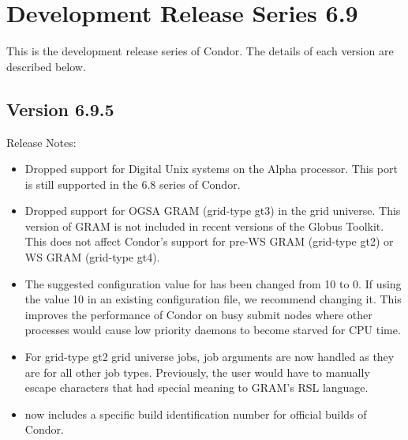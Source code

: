 
\section{\label{sec:History-6-9}Development Release Series 6.9}

This is the development release series of Condor.
The details of each version are described below.

\subsection*{\label{sec:New-6-9-5}Version 6.9.5}

\noindent Release Notes:

\begin{itemize}

\item Dropped support for Digital Unix systems on the Alpha processor.
This port is still supported in the 6.8 series of Condor.

\item Dropped support for OGSA GRAM (grid-type gt3) in the grid
universe. This version of GRAM is not included in recent versions of
the Globus Toolkit. This does not affect Condor's support for pre-WS
GRAM (grid-type gt2) or WS GRAM (grid-type gt4).

\item The suggested configuration value for
 has been changed from 10 to 0.  If
using the value 10 in an existing configuration file, we recommend
changing it.  This improves the performance of Condor on busy submit nodes
where other processes would cause low priority  daemons
to become starved for CPU time.

\item For grid-type gt2 grid universe jobs, job arguments are now handled
as they are for all other job types. Previously, the user would have to
manually escape characters that had special meaning to GRAM's RSL
language.

\item {} now includes a specific build
identification number for official builds of Condor.

\end{itemize}


